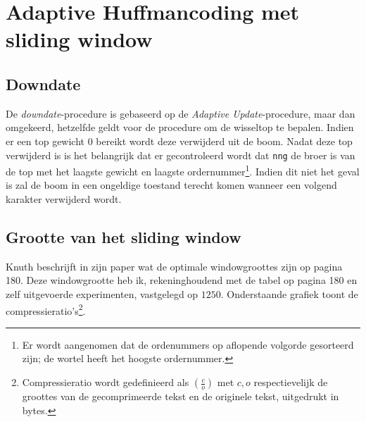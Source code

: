 \section{Adaptive Huffmancoding met sliding window}

\subsection{Downdate}
De \emph{downdate}-procedure is gebaseerd op de \emph{Adaptive Update}-procedure, maar dan omgekeerd, hetzelfde geldt voor de procedure om de wisseltop te bepalen. Indien er een top gewicht $0$ bereikt wordt deze verwijderd uit de boom. Nadat deze top verwijderd is is het belangrijk dat er gecontroleerd wordt dat \texttt{nng} de broer is van de top met het laagste gewicht en laagste ordernummer\footnote{Er wordt aangenomen dat de ordenummers op aflopende volgorde gesorteerd zijn; de wortel heeft het hoogste ordernummer.}. Indien dit niet het geval is zal de boom in een ongeldige toestand terecht komen wanneer een volgend karakter verwijderd wordt. 

\subsection{Grootte van het sliding window}
Knuth beschrijft in zijn paper \cite{knuthhuffman} wat de optimale windowgroottes zijn op pagina 180. Deze windowgrootte heb ik, rekeninghoudend met de tabel op pagina 180 en zelf uitgevoerde experimenten, vastgelegd op $1250$. Onderstaande grafiek toont de compressieratio's\footnote{Compressieratio wordt gedefinieerd als $(\frac{c}{o})$ met $c,o$ respectievelijk de groottes van de gecomprimeerde tekst en de originele tekst, uitgedrukt in bytes.}.